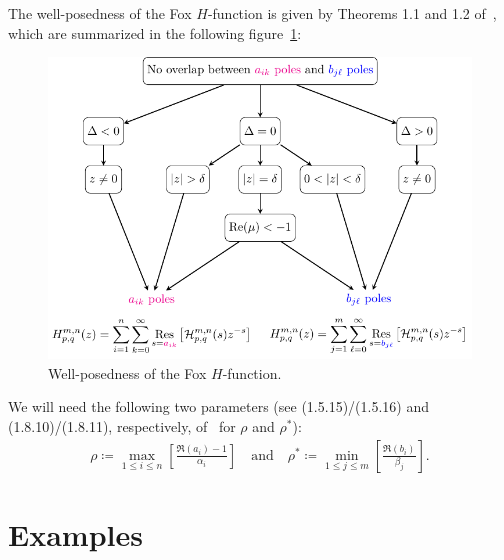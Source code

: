 \documentclass[11pt]{article}
\begin{document}
The well-posedness of the Fox $H$-function is given by Theorems 1.1 and 1.2
of~\cite{kilbas.saigo:04:h-transforms}, which are summarized in the following
figure~\ref{F:Wellposedness}:

\begin{figure}[htp]
  \centering
  \includegraphics[width=1.0\textwidth]{./Well-posedness.pdf}
  \caption{Well-posedness of the Fox $H$-function.}
  \label{F:Wellposedness}
\end{figure}

We will need the following two parameters (see (1.5.15)/(1.5.16) and
(1.8.10)/(1.8.11), respectively, of~\cite{kilbas.saigo:04:h-transforms} for
$\rho$ and $\rho^*$):
\begin{align*}
  \rho   \coloneqq \max_{1\le i\le n} \left[ \frac{\Re(a_i)-1}{\alpha_i} \right] \quad \text{and} \quad
  \rho^* \coloneqq \min_{1\le j\le m} \left[ \frac{\Re(b_i)}{\beta_j} \right].
\end{align*}

\newpage

\section{Examples}



\printbibliography[title={References}]
\end{document}
